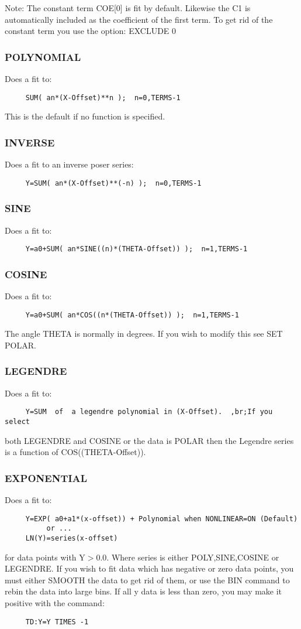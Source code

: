 Note:   The constant term COE[0] is fit by default.  Likewise the C1 is
automatically included as the coefficient of the first  term.   To  get
rid of the constant term you use the option:  EXCLUDE 0 
\subsubsection{POLYNOMIAL  }
Does a fit to:  
\begin{verbatim}
     SUM( an*(X-Offset)**n );  n=0,TERMS-1 
\end{verbatim}
This is the default if no function is specified.  
\subsubsection{INVERSE     }
Does a fit to an inverse poser series:  
\begin{verbatim}
     Y=SUM( an*(X-Offset)**(-n) );  n=0,TERMS-1 
\end{verbatim}
\subsubsection{SINE        }
Does a fit to:  
\begin{verbatim}
     Y=a0+SUM( an*SINE((n)*(THETA-Offset)) );  n=1,TERMS-1 
\end{verbatim}
\subsubsection{COSINE      }
Does a fit to:  
\begin{verbatim}
     Y=a0+SUM( an*COS((n*(THETA-Offset)) );  n=1,TERMS-1 
\end{verbatim}

The angle THETA is normally in degrees.  If you wish to modify this see
SET POLAR.  
\subsubsection{LEGENDRE    }
Does a fit to:  
\begin{verbatim}
     Y=SUM  of  a legendre polynomial in (X-Offset).  ,br;If you select
\end{verbatim}
both LEGENDRE and COSINE or the data is POLAR then the Legendre  series
is a function of COS((THETA-Offset)).  
\subsubsection{EXPONENTIAL }
Does a fit to:  
\begin{verbatim}
     Y=EXP( a0+a1*(x-offset)) + Polynomial when NONLINEAR=ON (Default) 
          or ...  
     LN(Y)=series(x-offset) 
\end{verbatim}
for data points with Y$>$0.0.  
Where series is either POLY,SINE,COSINE or LEGENDRE.  
If  you  wish  to  fit data which has negative or zero data points, you
must either SMOOTH the data to get rid of them, or use the BIN  command
to  rebin  the  data into large bins.  If all y data is less than zero,
you may make it positive with the command:  
\begin{verbatim}
     TD:Y=Y TIMES -1 
\end{verbatim}

